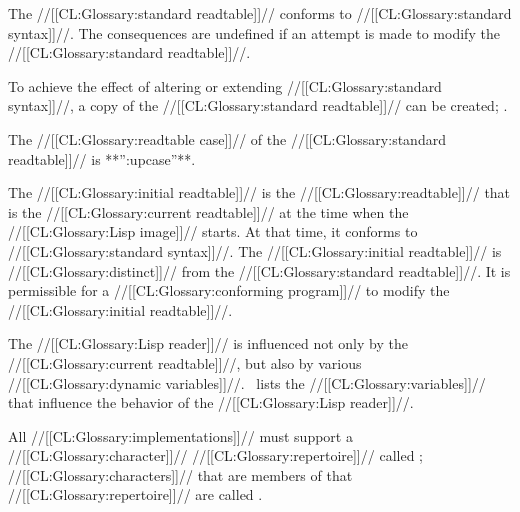 
The //[[CL:Glossary:standard readtable]]// conforms to //[[CL:Glossary:standard syntax]]//. The consequences are undefined if an attempt is made to modify the //[[CL:Glossary:standard readtable]]//.

To achieve the effect of altering or extending //[[CL:Glossary:standard syntax]]//, a copy of the //[[CL:Glossary:standard readtable]]// can be created; .

The //[[CL:Glossary:readtable case]]// of the //[[CL:Glossary:standard readtable]]// is **'':upcase''**.

\endsubsubsection%


The //[[CL:Glossary:initial readtable]]// is the //[[CL:Glossary:readtable]]// that is the //[[CL:Glossary:current readtable]]// at the time when the //[[CL:Glossary:Lisp image]]// starts. At that time, it conforms to //[[CL:Glossary:standard syntax]]//. The //[[CL:Glossary:initial readtable]]// is //[[CL:Glossary:distinct]]//  from the //[[CL:Glossary:standard readtable]]//. It is permissible for a //[[CL:Glossary:conforming program]]//  to modify the //[[CL:Glossary:initial readtable]]//.

\endsubsubsection%

\endSubsection%

 

The //[[CL:Glossary:Lisp reader]]// is influenced not only by the //[[CL:Glossary:current readtable]]//, but also by various //[[CL:Glossary:dynamic variables]]//.  \Thenextfigure\ lists the //[[CL:Glossary:variables]]// that influence the behavior of the //[[CL:Glossary:Lisp reader]]//.


\endsubsection%

 

 All //[[CL:Glossary:implementations]]// must support a //[[CL:Glossary:character]]// //[[CL:Glossary:repertoire]]// called ; //[[CL:Glossary:characters]]// that are members of that //[[CL:Glossary:repertoire]]// are called .

